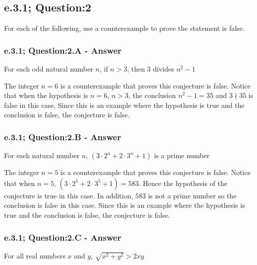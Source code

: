 \newpage
\subsection{e.3.1; Question:2}
For each of the following, use a counterexample to prove the statement is false. 
\subsubsection*{e.3.1; Question:2.A - Answer}

\begin{tcolorbox}
	\begin{conjecture}
		For each odd natural number $n$, if $n > 3$, then $3$ divides $n^2 - 1$
	\end{conjecture}
\end{tcolorbox}

The integer $n = 6$ is a counterexample that proves this conjecture is false. Notice that when the hypothesis is $n=6$, $n > 3$, the conclusion $n^2 - 1 = 35$ and $3 \nmid 35$ is false in this case. Since this is an example where the hypothesis is true and the conclusion is false, the conjecture is false. 


\subsubsection*{e.3.1; Question:2.B - Answer}

\begin{tcolorbox}
	\begin{conjecture}
		For each natural number $n$, $(3 \cdot 2^n + 2 \cdot 3^n + 1)$ is a prime number
	\end{conjecture}
\end{tcolorbox}

The integer $n = 5$ is a counterexample that proves this conjecture is false. Notice that when $n=5$, $(3 \cdot 2^5 + 2 \cdot 3^5 + 1) = 583$. Hence the hypothesis of the conjecture is true in this case. In addition, $583$ is not a prime number so the conclusion is false in this case. Since this is an example where the hypothesis is true and the conclusion is false, the conjecture is false. 



\subsubsection*{e.3.1; Question:2.C - Answer}

\begin{tcolorbox}
	\begin{conjecture}
		For all real numbers $x$ and $y$, $\sqrt{x^2 + y^2}>2xy$
	\end{conjecture}
\end{tcolorbox}

